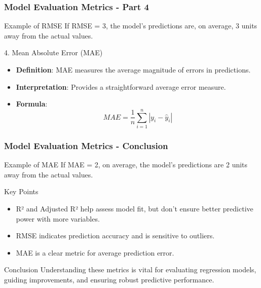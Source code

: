 \documentclass{beamer}
\begin{document}
\begin{frame}[fragile]
    \frametitle{Model Evaluation Metrics - Part 4}
    \begin{block}{Example of RMSE}
        If RMSE = 3, the model's predictions are, on average, 3 units away from the actual values.
    \end{block}
    
    \begin{block}{4. Mean Absolute Error (MAE)}
        \begin{itemize}
            \item \textbf{Definition}: MAE measures the average magnitude of errors in predictions.
            \item \textbf{Interpretation}: Provides a straightforward average error measure.
            \item \textbf{Formula}:
            \begin{equation}
                MAE = \frac{1}{n} \sum_{i=1}^{n} |y_i - \hat{y}_i|
            \end{equation}
        \end{itemize}
    \end{block}
\end{frame}

\begin{frame}[fragile]
    \frametitle{Model Evaluation Metrics - Conclusion}
    \begin{block}{Example of MAE}
        If MAE = 2, on average, the model’s predictions are 2 units away from the actual values.
    \end{block}
    
    \begin{block}{Key Points}
        \begin{itemize}
            \item R² and Adjusted R² help assess model fit, but don't ensure better predictive power with more variables.
            \item RMSE indicates prediction accuracy and is sensitive to outliers.
            \item MAE is a clear metric for average prediction error.
        \end{itemize}
    \end{block}
    
    \begin{block}{Conclusion}
        Understanding these metrics is vital for evaluating regression models, guiding improvements, and ensuring robust predictive performance.
    \end{block}
\end{frame}
\end{document}

